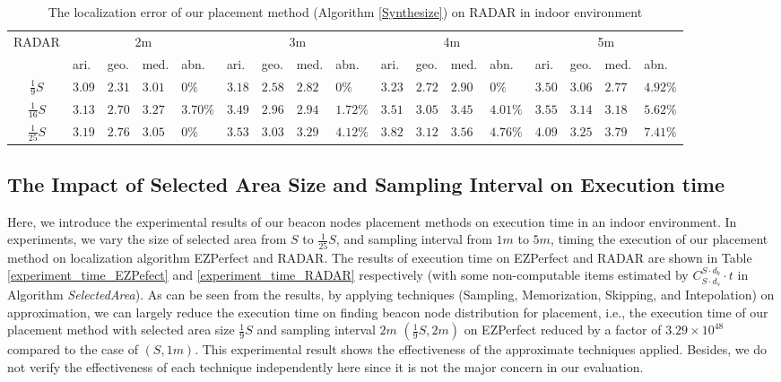\documentclass[10pt, conference, letterpaper]{IEEEtran}
\begin{document}
\begin{table*}[!t]
\renewcommand{\arraystretch}{1.0}
\caption{The localization error of our placement method (Algorithm \ref{Synthesize}) on RADAR in indoor environment} \label{experiment_error_RADAR}
\centering
\begin{tabular}{|c|p{0.5cm}|p{0.5cm}|p{0.5cm}|p{0.6cm}|p{0.5cm}|p{0.5cm}|p{0.5cm}|p{0.6cm}|p{0.5cm}|p{0.5cm}|p{0.5cm}|p{0.6cm}|p{0.5cm}|p{0.5cm}|p{0.5cm}|p{0.6cm}|}
  \hline
\multirow{2}{*}{RADAR} & \multicolumn{4}{c|}{2m} & \multicolumn{4}{c|}{3m} & \multicolumn{4}{c|}{4m} & \multicolumn{4}{c|}{5m} \\
  \cline{2-17} & ari. & geo. & med. & abn. & ari. & geo. & med. & abn. & ari. & geo. & med. & abn. & ari. & geo. & med. & abn. \\
  \hline
  $\frac{1}{9}S$ & $3.09$ & $2.31$ & $3.01$ & $0\%$ & $3.18$ & $2.58$ & $2.82$ & $0\%$ & $3.23$ & $2.72$ & $2.90$ & $0\%$ & $3.50$ & $3.06$ & $2.77$ & $4.92\%$ \\
  \hline
  $\frac{1}{16}S$ & $3.13$ & $2.70$ & $3.27$ & $3.70\%$ & $3.49$ & $2.96$ & $2.94$ & $1.72\%$ & $3.51$ & $3.05$ & $3.45$ & $4.01\%$ & $3.55$ & $3.14$ & $3.18$ & $5.62\%$ \\
  \hline
  $\frac{1}{25}S$ & $3.19$ & $2.76$ & $3.05$ & $0\%$ & $3.53$ & $3.03$ & $3.29$ & $4.12\%$ & $3.82$ & $3.12$ & $3.56$ & $4.76\%$ & $4.09$ & $3.25$ & $3.79$ & $7.41\%$ \\
  \hline
\end{tabular}
\end{table*}

\subsection{The Impact of Selected Area Size and Sampling Interval on Execution time}
Here, we introduce the experimental results of our beacon nodes placement methods on execution time in an indoor environment. In experiments, we vary the size of selected area from $S$ to $\frac{1}{25}S$, and sampling interval from $1m$ to $5m$, timing the execution of our placement method on localization algorithm EZPerfect and RADAR. The results of execution time on EZPerfect and RADAR are shown in Table \ref{experiment_time_EZPefect} and \ref{experiment_time_RADAR} respectively (with some non-computable items estimated by $C_{S \cdot d_s}^{S \cdot d_b} \cdot t$ in Algorithm \textit{SelectedArea}). As can be seen from the results, by applying techniques (Sampling, Memorization, Skipping, and Intepolation) on approximation, we can largely reduce the execution time on finding beacon node distribution for placement, i.e., the execution time of our placement method with selected area size $\frac{1}{9}S$ and sampling interval $2m$ $(\frac{1}{9}S, 2m)$ on EZPerfect reduced by a factor of $3.29\times 10^{48}$ compared to the case of $(S, 1m)$. This experimental result shows the effectiveness of the approximate techniques applied. Besides, we do not verify the effectiveness of each technique independently here since it is not the major concern in our evaluation.
\end{document}
